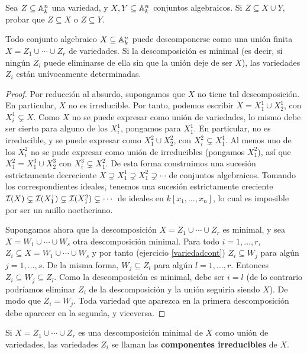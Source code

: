 \documentclass[ACGA.tex]{subfiles}
\begin{document}
\begin{ejer}\label{variedadcont}
 Sea $Z\subseteq\mathbb{A}^n_k$ una variedad, y $X,Y\subseteq\mathbb{A}^n_k$ conjuntos algebraicos. Si $Z\subseteq X\cup Y$, probar que $Z\subseteq X$ o $Z\subseteq Y$.
\end{ejer}


\begin{prop}
 Todo conjunto algebraico $X\subseteq \mathbb{A}^n_k$ puede descomponerse como una unión finita $X=Z_1\cup\cdots\cup Z_r$ de variedades. Si la descomposición es minimal (es decir, si ningún $Z_i$ puede eliminarse de ella sin que la unión deje de ser $X$), las variedades $Z_i$ están unívocamente determinadas.
\end{prop}

\begin{proof}
 Por reducción al absurdo, supongamos que $X$ no tiene tal descomposición. En particular, $X$ no es irreducible. Por tanto, podemos escribir $X=X^1_1\cup X^1_2$, con $X^1_i\subsetneq X$. Como $X$ no se puede expresar como unión de variedades, lo mismo debe ser cierto para alguno de los $X^1_i$, pongamos para $X^1_1$. En particular, no es irreducible, y se puede expresar como $X^2_1\cup X^2_2$, con $X^2_i\subsetneq X^1_1$. Al menos uno de los $X^2_i$ no se pude expresar como unión de irreducibles (pongamos $X^2_1$), así que $X^2_1=X^3_1\cup X^3_2$ con $X^3_i\subsetneq X^2_1$. De esta forma construimos una sucesión estrictamente decreciente $X\supsetneq X^1_1\supsetneq X^2_1\supsetneq\cdots$ de conjuntos algebraicos. Tomando los correspondientes ideales, tenemos una sucesión estrictamente creciente $\mathcal{I}(X)\subsetneq \mathcal{I}(X^1_1)\subsetneq\mathcal{I}(X^2_1)\subsetneq\cdots$ de ideales en $k[x_1,\ldots,x_n]$, lo cual es imposible por ser un anillo noetheriano.

Supongamos ahora que la descomposición $X=Z_1\cup\cdots\cup Z_r$ es minimal, y sea $X=W_1\cup\cdots\cup W_s$ otra descomposición minimal. Para todo $i=1,\ldots,r$, $Z_i\subseteq X=W_1\cup\cdots\cup W_s$ y por tanto (ejercicio \ref{variedadcont}) $Z_i\subseteq W_j$ para algún $j=1,\ldots,s$. De la misma forma, $W_j\subseteq Z_l$ para algún $l=1,\ldots,r$. Entonces $Z_i\subseteq W_j\subseteq Z_l$. Como la descomposición es minimal, debe ser $i=l$ (de lo contrario podríamos eliminar $Z_i$ de la descomposición y la unión seguiría siendo $X$). De modo que $Z_i=W_j$. Toda variedad que aparezca en la primera descomposición debe aparecer en la segunda, y viceversa.
\end{proof}

\begin{defi}
 Si $X=Z_1\cup\cdots\cup Z_r$ es una descomposición minimal de $X$ como unión de variedades, las variedades $Z_i$ se llaman las {\bf componentes irreducibles} de $X$.
\end{defi}
\end{document}
